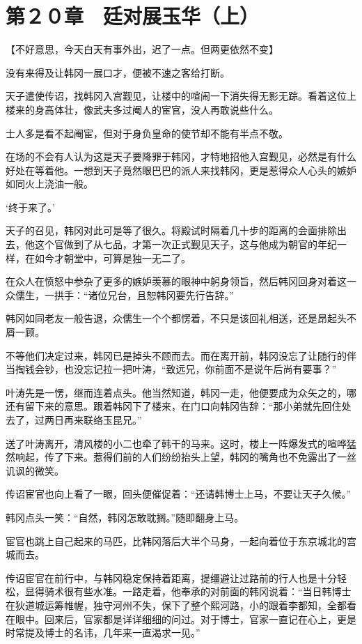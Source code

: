 \section{第２０章　廷对展玉华（上）}

【不好意思，今天白天有事外出，迟了一点。但两更依然不变】

没有来得及让韩冈一展口才，便被不速之客给打断。

天子遣使传诏，找韩冈入宫觐见，让楼中的喧闹一下消失得无影无踪。看着这位上楼来的身高体壮，像武夫多过阉人的宦官，没人再敢说些什么。

士人多是看不起阉宦，但对于身负皇命的使节却不能有半点不敬。

在场的不会有人认为这是天子要降罪于韩冈，才特地招他入宫觐见，必然是有什么好处在等着他。一想到天子竟然眼巴巴的派人来找韩冈，更是惹得众人心头的嫉妒如同火上浇油一般。

‘终于来了。’

天子的召见，韩冈对此可是等了很久。将殿试时隔着几十步的距离的会面排除出去，他这个官做到了从七品，才第一次正式觐见天子，这与他成为朝官的年纪一样，在如今才朝堂中，可算是独一无二了。

在众人在愤怒中参杂了更多的嫉妒羡慕的眼神中躬身领旨，然后韩冈回身对着这一众儒生，一拱手：“诸位兄台，且恕韩冈要先行告辞。”

韩冈如同老友一般告退，众儒生一个个都愣着，不只是该回礼相送，还是昂起头不屑一顾。

不等他们决定过来，韩冈已是掉头不顾而去。而在离开前，韩冈没忘了让随行的伴当掏钱会钞，也没忘记拉一把叶涛，“致远兄，你前面不是说午后尚有要事？”

叶涛先是一愣，继而连着点头。他当然知道，韩冈一走，他便要成为众矢之的，哪还有留下来的意思。跟着韩冈下了楼来，在门口向韩冈告辞：“那小弟就先回住处去了，过两日再来联络玉昆兄。”

送了叶涛离开，清风楼的小二也牵了韩干的马来。这时，楼上一阵爆发式的喧哗猛然响起，传了下来。惹得们前的人们纷纷抬头上望，韩冈的嘴角也不免露出了一丝讥讽的微笑。

传诏宦官也向上看了一眼，回头便催促着：“还请韩博士上马，不要让天子久候。”

韩冈点头一笑：“自然，韩冈怎敢耽搁。”随即翻身上马。

宦官也跳上自己起来的马匹，比韩冈落后大半个马身，一起向着位于东京城北的宫城而去。

传诏宦官在前行中，与韩冈稳定保持着距离，提缰避让过路前的行人也是十分轻松，显得骑术很有些水准。一路走着，他奉承的对前面的韩冈说着：“当日韩博士在狄道城运筹帷幄，独守河州不失，保下了整个熙河路，小的跟着李都知，全都看在眼中。回来后，官家都是详详细细的问过。对于博士，官家一直记在心上，更是时常提及博士的名讳，几年来一直渴求一见。”

